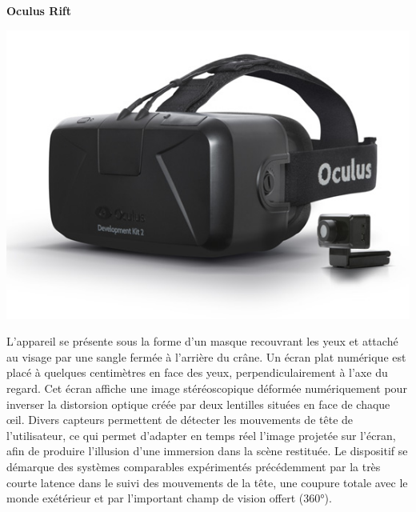 \textbf{Oculus Rift}
\\
	\noindent\begin{minipage}{0.2\textwidth}
		\includegraphics[width=\linewidth]{1-PreEtude/img/occulus_rift}
		\end{minipage}
		\hfill
		\begin{minipage}{0.8\textwidth}
			L'appareil se présente sous la forme d'un masque recouvrant les yeux et attaché au visage par une sangle fermée à l'arrière du crâne. Un écran plat numérique est placé à quelques centimètres en face des yeux, perpendiculairement à l'axe du regard. Cet écran affiche une image stéréoscopique déformée numériquement pour inverser la distorsion optique créée par deux lentilles situées en face de chaque œil. Divers capteurs permettent de détecter les mouvements de tête de l'utilisateur, ce qui permet d'adapter en temps réel l'image projetée sur l'écran, afin de produire l'illusion d'une immersion dans la scène restituée.
			Le dispositif se démarque des systèmes comparables expérimentés précédemment par la très courte latence dans le suivi des mouvements de la tête, une coupure totale avec le monde exétérieur et par l'important champ de vision offert (360°).
	\end{minipage}



